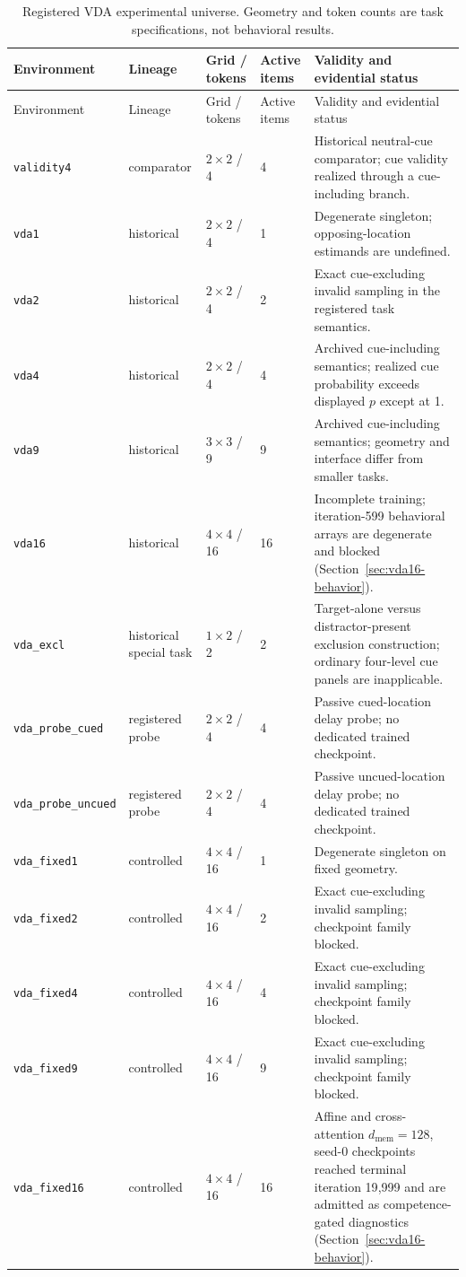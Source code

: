 \documentclass[11pt,a4paper]{article}
\newcommand{\env}[1]{\texttt{#1}}
\begin{document}
\begingroup\small
\begin{longtable}{@{}>{\RaggedRight\arraybackslash}p{3.2cm}p{2.2cm}p{2.3cm}p{2.0cm}p{5.4cm}@{}}
\caption{Registered VDA experimental universe. Geometry and token counts are task specifications, not behavioral results.}\label{tab:environments}\\
\toprule
Environment & Lineage & Grid / tokens & Active items & Validity and evidential status\\
\midrule\endfirsthead
\toprule Environment & Lineage & Grid / tokens & Active items & Validity and evidential status\\\midrule\endhead
\env{validity4} & comparator & $2\times2$ / 4 & 4 & Historical neutral-cue comparator; cue validity realized through a cue-including branch.\\
\env{vda1} & historical & $2\times2$ / 4 & 1 & Degenerate singleton; opposing-location estimands are undefined.\\
\env{vda2} & historical & $2\times2$ / 4 & 2 & Exact cue-excluding invalid sampling in the registered task semantics.\\
\env{vda4} & historical & $2\times2$ / 4 & 4 & Archived cue-including semantics; realized cue probability exceeds displayed $p$ except at 1.\\
\env{vda9} & historical & $3\times3$ / 9 & 9 & Archived cue-including semantics; geometry and interface differ from smaller tasks.\\
\env{vda16} & historical & $4\times4$ / 16 & 16 & Incomplete training; iteration-599 behavioral arrays are degenerate and blocked (Section~\ref{sec:vda16-behavior}).\\
\env{vda\_excl} & historical special task & $1\times2$ / 2 & 2 & Target-alone versus distractor-present exclusion construction; ordinary four-level cue panels are inapplicable.\\
\env{vda\_probe\_cued} & registered probe & $2\times2$ / 4 & 4 & Passive cued-location delay probe; no dedicated trained checkpoint.\\
\env{vda\_probe\_uncued} & registered probe & $2\times2$ / 4 & 4 & Passive uncued-location delay probe; no dedicated trained checkpoint.\\
\env{vda\_fixed1} & controlled & $4\times4$ / 16 & 1 & Degenerate singleton on fixed geometry.\\
\env{vda\_fixed2} & controlled & $4\times4$ / 16 & 2 & Exact cue-excluding invalid sampling; checkpoint family blocked.\\
\env{vda\_fixed4} & controlled & $4\times4$ / 16 & 4 & Exact cue-excluding invalid sampling; checkpoint family blocked.\\
\env{vda\_fixed9} & controlled & $4\times4$ / 16 & 9 & Exact cue-excluding invalid sampling; checkpoint family blocked.\\
\env{vda\_fixed16} & controlled & $4\times4$ / 16 & 16 & Affine and cross-attention $d_\mathrm{mem}=128$, seed-0 checkpoints reached terminal iteration 19{,}999 and are admitted as competence-gated diagnostics (Section~\ref{sec:vda16-behavior}).\\
\bottomrule
\end{longtable}
\endgroup
\end{document}
